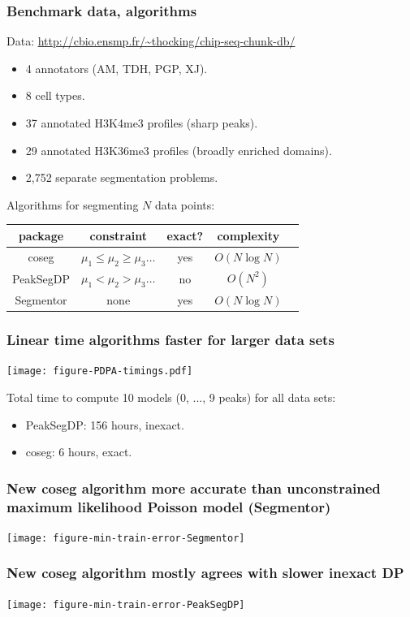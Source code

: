 \documentclass{beamer}
\begin{document}
\begin{frame}
  \frametitle{Benchmark data, algorithms}

  Data: \url{http://cbio.ensmp.fr/~thocking/chip-seq-chunk-db/}
  \begin{itemize}
  \item 4 annotators (AM, TDH, PGP, XJ).
  \item 8 cell types.
  \item 37 annotated H3K4me3 profiles (sharp peaks).
  \item 29 annotated H3K36me3 profiles (broadly enriched domains).
  \item 2,752 separate segmentation problems.
  \end{itemize}

  Algorithms for segmenting $N$ data points:
  \begin{center}
  \begin{tabular}{ccccc}
    package & constraint & exact? & complexity \\
    \hline
    coseg & $\mu_1 \leq \mu_2 \geq \mu_3 \dots$ & yes & $O(N\log N)$ \\
    PeakSegDP & $\mu_1 < \mu_2 > \mu_3 \dots$ & no & $O(N^2)$\\
    Segmentor & none & yes & $O(N\log N)$
  \end{tabular}
  \end{center}
\end{frame}

\begin{frame}
  \frametitle{Linear time algorithms faster for larger data sets}
  \texttt{[image: figure-PDPA-timings.pdf]}

  Total time to compute 10 models (0, ..., 9 peaks) for all data sets:
  \begin{itemize}
  \item PeakSegDP: 156 hours, inexact.
  \item coseg: 6 hours, exact.
  \end{itemize}
\end{frame}

\begin{frame}
  \frametitle{New coseg algorithm more accurate than unconstrained
    maximum likelihood Poisson model (Segmentor)}
  \texttt{[image: figure-min-train-error-Segmentor]}
\end{frame}

\begin{frame}
  \frametitle{New coseg algorithm mostly agrees with slower inexact DP}
  \texttt{[image: figure-min-train-error-PeakSegDP]}
\end{frame}
\end{document}
